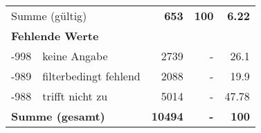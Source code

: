 \begin{longtable}{lXrrr}
     \midrule
     \multicolumn{2}{l}{Summe (gültig)} &
       \textbf{\num{653}} &
     \textbf{\num{100}} &
       \textbf{\num[round-mode=places,round-precision=2]{6.22}} \\
     \multicolumn{5}{l}{\textbf{Fehlende Werte}}\\
       -998 &
       keine Angabe &
         \num{2739} &
        - &
         \num[round-mode=places,round-precision=2]{26.1} \\
       -989 &
       filterbedingt fehlend &
         \num{2088} &
        - &
         \num[round-mode=places,round-precision=2]{19.9} \\
       -988 &
       trifft nicht zu &
         \num{5014} &
        - &
         \num[round-mode=places,round-precision=2]{47.78} \\
     \midrule
     \multicolumn{2}{l}{\textbf{Summe (gesamt)}} &
          \textbf{\num{10494}} &
        \textbf{-} &
        \textbf{\num{100}} \\
     \bottomrule
     \end{longtable}
     
